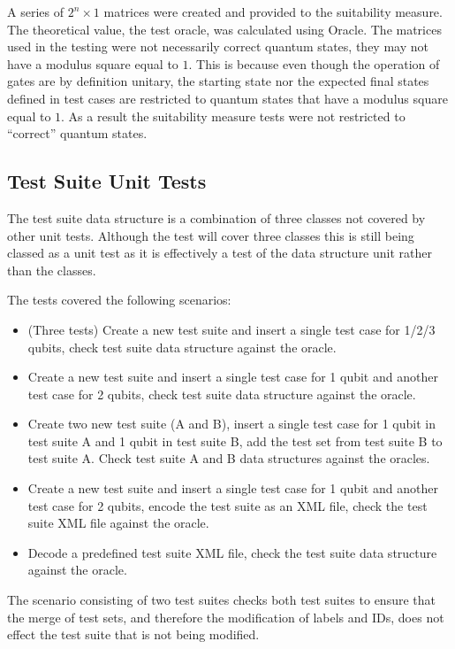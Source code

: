 A series of $2^n\times1$ matrices were created and provided to the suitability measure.
The theoretical value, the test oracle, was calculated using Oracle.
The matrices used in the testing were not necessarily correct quantum states, they may not have a modulus square equal to $1$.
This is because even though the operation of gates are by definition unitary, the starting state nor the expected final states defined in test cases are restricted to quantum states that have a modulus square equal to $1$.
As a result the suitability measure tests were not restricted to ``correct'' quantum states.

\subsection{Test Suite Unit Tests}
The test suite data structure is a combination of three classes not covered by other unit tests.
Although the test will cover three classes this is still being classed as a unit test as it is effectively a test of the data structure unit rather than the classes.

The tests covered the following scenarios:
\begin{itemize}
 \item (Three tests) Create a new test suite and insert a single test case for 1/2/3 qubits, check test suite data structure against the oracle.
 \item Create a new test suite and insert a single test case for 1 qubit and another test case for 2 qubits, check test suite data structure against the oracle.
 \item Create two new test suite (A and B), insert a single test case for 1 qubit in test suite A and 1 qubit in test suite B, add the test set from test suite B to test suite A. Check test suite A and B data structures against the oracles.
 \item Create a new test suite and insert a single test case for 1 qubit and another test case for 2 qubits, encode the test suite as an XML file, check the test suite XML file against the oracle.
 \item Decode a predefined test suite XML file, check the test suite data structure against the oracle.
\end{itemize}

The scenario consisting of two test suites checks both test suites to ensure that the merge of test sets, and therefore the modification of labels and IDs, does not effect the test suite that is not being modified.

